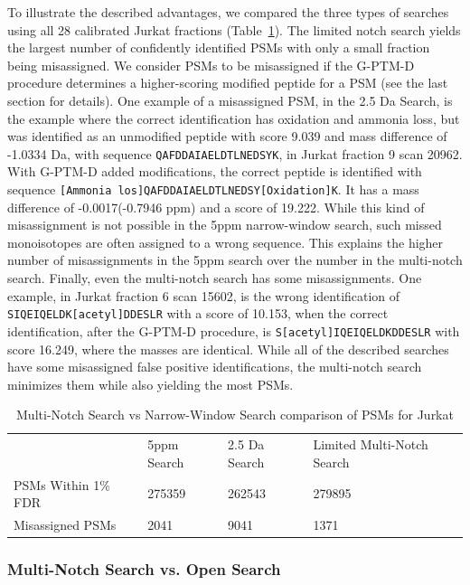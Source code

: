 \documentclass[journal=jprobs,manuscript=article]{achemso}
\begin{document}
To illustrate the described advantages, we compared the three types of searches using all 28 calibrated Jurkat fractions (Table~\ref{tbl:singleVsMultiNotch}).
The limited notch search yields the largest number of confidently identified PSMs with only a small fraction being misassigned.
We consider PSMs to be misassigned if the G-PTM-D procedure determines a higher-scoring modified peptide for a PSM (see the last section for details).
One example of a misassigned PSM, in the 2.5 Da Search, is the example where the correct identification has oxidation and ammonia loss, but was identified as an unmodified peptide with score 9.039 and mass difference of -1.0334 Da, with sequence \texttt{QAFDDAIAELDTLNEDSYK}, in Jurkat fraction 9 scan 20962.
With G-PTM-D added modifications, the correct peptide is identified with sequence \texttt{[Ammonia los]QAFDDAIAELDTLNEDSY[Oxidation]K}. It has a mass difference of -0.0017(-0.7946 ppm) and a score of 19.222.
While this kind of misassignment is not possible in the 5ppm narrow-window search, such missed monoisotopes are often assigned to a wrong sequence.
This explains the higher number of misassignments in the 5ppm search over the number in the multi-notch search.
Finally, even the multi-notch search has some misassignments.
One example, in Jurkat fraction 6 scan 15602, is the wrong identification of \texttt{SIQEIQELDK[acetyl]DDESLR} with a score of 10.153, when the correct identification, after the G-PTM-D procedure, is \texttt{S[acetyl]IQEIQELDKDDESLR} with score 16.249, where the masses are identical.
While all of the described searches have some misassigned false positive identifications, the multi-notch search minimizes them while also yielding the most PSMs.

\begin{table}[]
\centering
\caption{Multi-Notch Search vs Narrow-Window Search comparison of PSMs for Jurkat}
\label{tbl:singleVsMultiNotch}
\begin{tabular}{llll}
                    & 5ppm Search & 2.5 Da Search & Limited Multi-Notch Search \\
PSMs Within 1\% FDR & 275359      & 262543        & 279895       \\
Misassigned PSMs    & 2041           & 9041          & 1371            \\
\end{tabular}
\end{table}

\subsubsection{Multi-Notch Search vs. Open Search}
\end{document}
